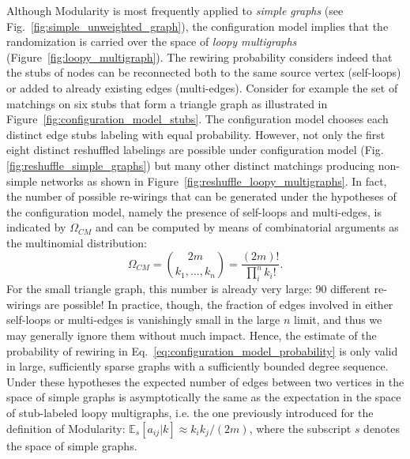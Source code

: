 Although Modularity is most frequently applied to \emph{simple graphs} (see Fig.~\ref{fig:simple_unweighted_graph}), the configuration model implies that the randomization is carried over the space of \emph{loopy multigraphs} (Figure~\ref{fig:loopy_multigraph}).
The rewiring probability considers indeed that the stubs of nodes can be reconnected both to the same source vertex (self-loops) or added to already existing edges (multi-edges).
Consider for example the set of matchings on six stubs that form a triangle graph as illustrated in Figure~\ref{fig:configuration_model_stubs}. The configuration model chooses each distinct edge stubs labeling with equal probability. However, not only the first eight distinct reshuffled labelings are possible under configuration model (Fig.\ref{fig:reshuffle_simple_graphs}) but many other distinct matchings producing non-simple networks as shown in Figure~\ref{fig:reshuffle_loopy_multigraphs}.
In fact, the number of possible re-wirings that can be generated under the hypotheses of the configuration model, namely the presence of self-loops and multi-edges, is indicated by $\Omega_{CM}$ and can be computed by means of combinatorial arguments as the multinomial distribution:
\begin{equation}\label{eq:cm_possible_rewirings}
\Omega_{CM} = \binom{2m}{k_1,\ldots,k_n} = \frac{(2m)!}{\prod_i^n k_i!}.
\end{equation}
For the small triangle graph, this number is already very large: 90 different re-wirings are possible!
In practice, though, the fraction of edges involved in either self-loops or multi-edges is vanishingly small in the large $n$ limit, and thus we may generally ignore them without much impact. 
Hence, the estimate of the probability of rewiring in Eq.~\ref{eq:configuration_model_probability} is only valid in large, sufficiently sparse graphs with a sufficiently bounded degree sequence.
Under these hypotheses the expected number of edges between two vertices in the space of simple graphs is asymptotically the same as the expectation in the space of stub-labeled loopy multigraphs, i.e. the one previously introduced for the definition of Modularity: $\mathbb{E}_s[a_{ij} |k] \approx k_i k_j /(2m)$, where the subscript $s$ denotes the space of simple graphs.

